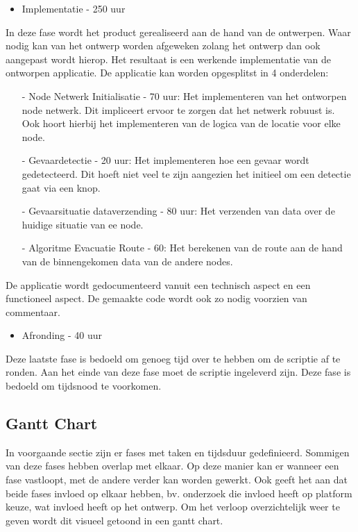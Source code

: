 \documentclass{../local}
\begin{document}
\begin{itemize}
\item Implementatie - 250 uur
\end{itemize}
In deze fase wordt het product gerealiseerd aan de hand van de ontwerpen. Waar nodig kan van het ontwerp worden afgeweken zolang het ontwerp dan ook aangepast wordt hierop. Het resultaat is een werkende implementatie van de ontworpen applicatie. De applicatie kan worden opgesplitst in 4 onderdelen:
\begin{itemize}
\item[-] Node Netwerk Initialisatie - 70 uur: Het implementeren van het ontworpen node netwerk. Dit impliceert ervoor te zorgen dat het netwerk robuust is. Ook hoort hierbij het implementeren van de logica van de locatie voor elke node.
\item[-] Gevaardetectie - 20 uur: Het implementeren hoe een gevaar wordt gedetecteerd. Dit hoeft niet veel te zijn aangezien het initieel om een detectie gaat via een knop.
\item[-] Gevaarsituatie dataverzending - 80 uur: Het verzenden van data over de huidige situatie van ee node. 
\item[-] Algoritme Evacuatie Route - 60: Het berekenen van de route aan de hand van de binnengekomen data van de andere nodes. 
\end{itemize}

\noindent De applicatie wordt gedocumenteerd vanuit een technisch aspect en een functioneel aspect. De gemaakte code wordt ook zo nodig voorzien van commentaar. 

\begin{itemize}
\item Afronding - 40 uur
\end{itemize}
Deze laatste fase is bedoeld om genoeg tijd over te hebben om de scriptie af te ronden. Aan het einde van deze fase moet de scriptie ingeleverd zijn. Deze fase is bedoeld om tijdsnood te voorkomen.

\newpage
\subsection{Gantt Chart}
In voorgaande sectie zijn er fases met taken en tijdsduur gedefinieerd. Sommigen van deze fases hebben overlap met elkaar. Op deze manier kan er wanneer een fase vastloopt, met de andere verder kan worden gewerkt. Ook geeft het aan dat beide fases invloed op elkaar hebben, bv. onderzoek die invloed heeft op platform keuze, wat invloed heeft op het ontwerp. Om het verloop overzichtelijk weer te geven wordt dit visueel getoond in een gantt chart.
\end{document}
